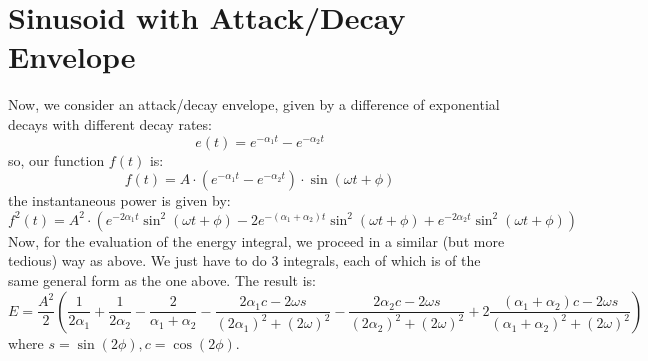 \section{Sinusoid with Attack/Decay Envelope}
Now, we consider an attack/decay  envelope, given by a difference of exponential decays with different decay rates:
\begin{equation}
 e(t) = e^{-\alpha_1 t} - e^{-\alpha_2 t}
\end{equation}
so, our function $f(t)$ is:
\begin{equation}
\boxed
{
  f(t) = A \cdot (e^{-\alpha_1 t} - e^{-\alpha_2 t}) \cdot \sin(\omega t + \phi)
}
\end{equation}
the instantaneous power is given by:
\begin{equation}
  f^2(t) = A^2 \cdot 
  \left(
      e^{-2\alpha_1 t}           \sin^2(\omega t+\phi) 
  - 2 e^{-(\alpha_1+\alpha_2) t} \sin^2(\omega t+\phi)  
  +   e^{-2\alpha_2 t}           \sin^2(\omega t+\phi)  
  \right)
\end{equation}
Now, for the evaluation of the energy integral, we proceed in a similar (but more tedious) way as above. We just have to do 3 integrals, each of which is of the same general form as the one above. The result is:
\begin{equation}
\boxed
{
  E = \frac{A^2}{2} 
  \left( 
   \frac{1}{2\alpha_1} + \frac{1}{2\alpha_2} - \frac{2}{\alpha_1 + \alpha_2}
    - \frac{2\alpha_1 c - 2\omega s}{(2\alpha_1)^2+(2\omega)^2}
    - \frac{2\alpha_2 c - 2\omega s}{(2\alpha_2)^2+(2\omega)^2} 
    + 2\frac{(\alpha_1+\alpha_2) c -2\omega s}{(\alpha_1+\alpha_2)^2+(2\omega)^2} 
   \right)
}
\end{equation}
where $s = \sin(2 \phi), c = \cos(2 \phi)$.
 







